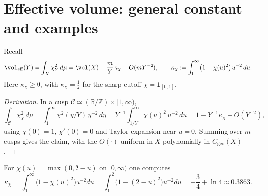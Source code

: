 \appendix
\section{Effective volume: general constant and examples}\label{app:effvol}
Recall
\[
\vol_{\mathrm{eff}}(Y)=\int_X \chi_Y^2\,d\mu
=\vol(X) - \frac{m}{Y}\,\kappa_\chi + O(mY^{-2}),\qquad
\kappa_\chi:=\int_{1}^{\infty} \bigl(1-\chi(u)^2\bigr)\,u^{-2}\,du .
\]
Here $\kappa_\chi\ge 0$, with $\kappa_\chi= \tfrac12$ for the sharp cutoff $\chi=\mathbf{1}_{[0,1]}$.

\begin{proof}[Derivation]
In a cusp $\mathcal{C}\simeq (\mathbb{R}/\mathbb{Z})\times [1,\infty)$,
\[
\int_{\mathcal{C}} \chi_Y^2\,d\mu
= \int_{1}^\infty \chi^2(y/Y)\,y^{-2}\,dy
= Y^{-1}\!\int_{1/Y}^{\infty} \chi(u)^2\,u^{-2}\,du
= 1 - Y^{-1}\kappa_\chi + O(Y^{-2}),
\]
using $\chi(0)=1$, $\chi'(0)=0$ and Taylor expansion near $u=0$. Summing over $m$ cusps gives the claim, with the $O(\cdot)$ uniform in $X$ polynomially in $C_{\mathrm{geo}}(X)$.
\end{proof}

\begin{example}
For $\chi(u)=\max(0,2-u)$ on $[0,\infty)$ one computes
\[
\kappa_\chi=\int_1^\infty\!\bigl(1-\chi(u)^2\bigr)u^{-2}du
=\int_1^2 \!\bigl(1-(2-u)^2\bigr)u^{-2}du
= -\frac34 + \ln 4 \approx 0.3863 .
\]
\end{example}
